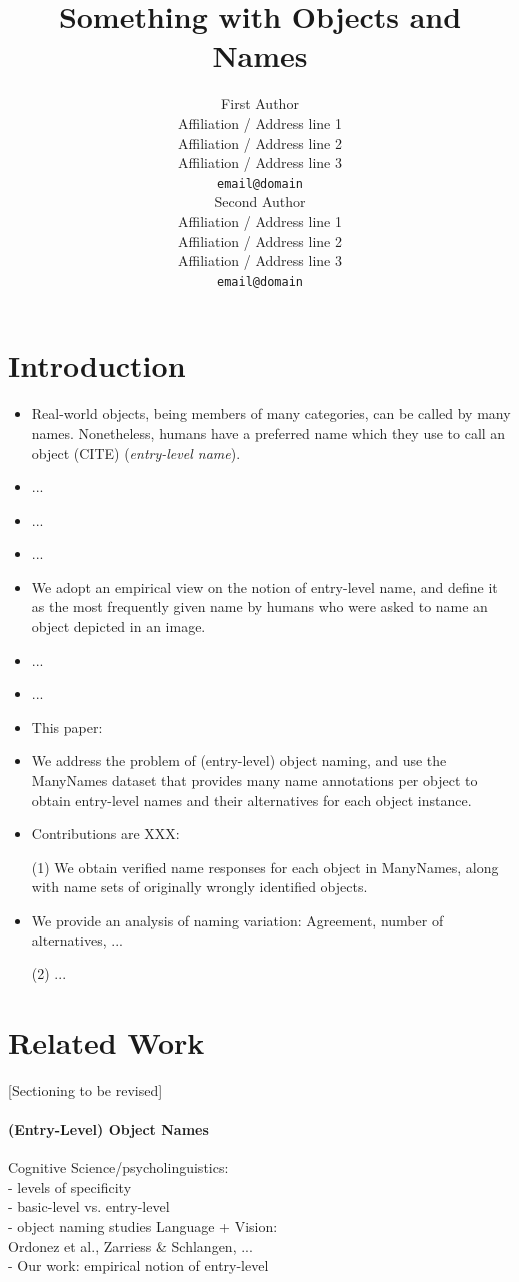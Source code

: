 \documentclass[11pt,a4paper]{article}
\title{Something with Objects and Names}
\author{First Author \\
  Affiliation / Address line 1 \\
  Affiliation / Address line 2 \\
  Affiliation / Address line 3 \\
  \texttt{email@domain} \\\And
  Second Author \\
  Affiliation / Address line 1 \\
  Affiliation / Address line 2 \\
  Affiliation / Address line 3 \\
  \texttt{email@domain} \\}
\date{}
\newcommand{\mn}{ManyNames\xspace}
\begin{document}
\maketitle
\begin{abstract}

\end{abstract}

\section{Introduction}
\label{sec:intro}
%

\begin{itemize}
	\item Real-world objects, being members of many categories, can be called by many names. Nonetheless, humans have a preferred name which they use to call an object (CITE) (\textsl{entry-level name}). 
	\item ...
	\item ...
	\item ...
	\item We adopt an empirical view on the notion of entry-level name, and define it  as the most frequently given name by humans who were asked to name an object depicted in an image. 
	\item ...
	\item ...
	\item This paper:
	\item We address the problem of (entry-level) object naming, and use the \mn dataset that provides many name annotations per object to obtain entry-level names and their alternatives for each object instance. 
	\item Contributions are XXX:
	\item[(1)] We obtain verified name responses for each object in \mn, along with name sets of originally wrongly identified objects. 
	\item We provide an analysis of naming variation: Agreement, number of alternatives, ...
	\item[(2)] ...
\end{itemize}

\section{Related Work}
\label{sec:related}
%

[Sectioning to be revised]

\paragraph{(Entry-Level) Object Names}
Cognitive Science/psycholinguistics:\\
- levels of specificity\\
- basic-level vs. entry-level\\
- object naming studies
Language + Vision:\\
Ordonez et al., Zarriess \& Schlangen, ... \\
- Our work: empirical notion of entry-level
\end{document}

